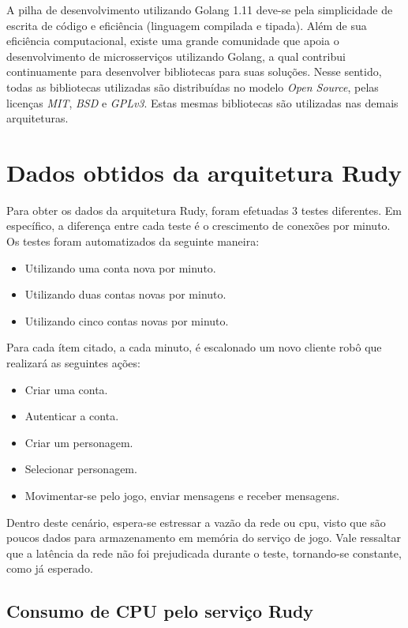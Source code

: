 A pilha de desenvolvimento utilizando Golang 1.11 deve-se pela simplicidade de escrita de código e eficiência (linguagem compilada e tipada).
%
Além de sua eficiência computacional, existe uma grande comunidade que apoia o desenvolvimento de microsserviços utilizando Golang, a qual contribui continuamente para desenvolver bibliotecas para suas soluções.
%
Nesse sentido, todas as bibliotecas utilizadas são distribuídas no modelo \textit{Open Source}, pelas licenças \textit{MIT}, \textit{BSD} e \textit{GPLv3}.
%
Estas mesmas bibliotecas são utilizadas nas demais arquiteturas.

 
\section{Dados obtidos da arquitetura Rudy}

Para obter os dados da arquitetura Rudy, foram efetuadas 3 testes diferentes.
%
Em específico, a diferença entre cada teste é o crescimento de conexões por minuto.
%
Os testes foram automatizados da seguinte maneira:

\begin{itemize}
 \item Utilizando uma conta nova por minuto.
 \item Utilizando duas contas novas por minuto.
 \item Utilizando cinco contas novas por minuto.
\end{itemize}

Para cada ítem citado, a cada minuto, é escalonado um novo cliente robô que realizará as seguintes ações:

\begin{itemize}
 \item Criar uma conta.
 \item Autenticar a conta.
 \item Criar um personagem.
 \item Selecionar personagem.
 \item Movimentar-se pelo jogo, enviar mensagens e receber mensagens.
\end{itemize}

Dentro deste cenário, espera-se estressar a vazão da rede ou \ac{cpu}, visto que são poucos dados para armazenamento em memória do serviço de jogo.
%
Vale ressaltar que a latência da rede não foi prejudicada durante o teste, tornando-se constante, como já esperado.


\subsection{Consumo de CPU pelo serviço Rudy}

